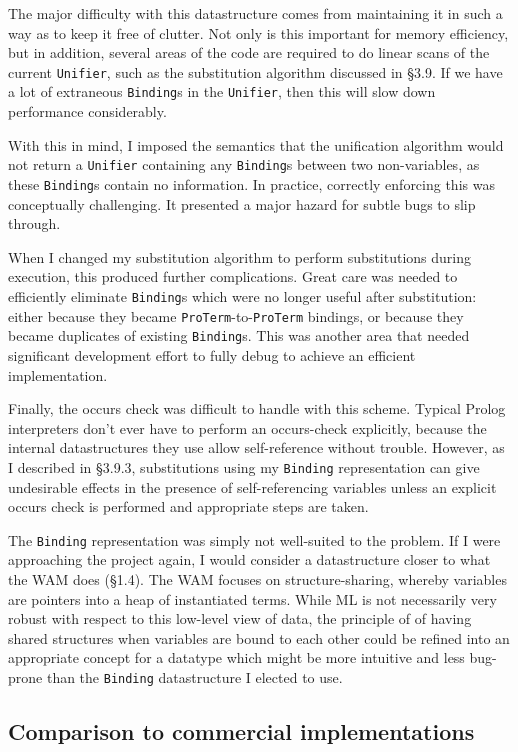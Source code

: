 \documentclass[12pt]{article}
\begin{document}
The major difficulty with this datastructure comes from maintaining it in such a way as to keep it free of clutter. 
Not only is this important for memory efficiency, but in addition, several areas of the code are required to do linear scans of the current \verb|Unifier|, such as the substitution algorithm discussed in \S3.9. 
If we have a lot of extraneous \verb|Binding|s in the \verb|Unifier|, then this will slow down performance considerably.

With this in mind, I imposed the semantics that the unification algorithm would not return a \verb|Unifier| containing any \verb|Binding|s between two non-variables, as these \verb|Binding|s contain no information. 
In practice, correctly enforcing this was conceptually challenging. 
It presented a major hazard for subtle bugs to slip through. 

When I changed my substitution algorithm to perform substitutions during execution, this produced further complications. 
Great care was needed to efficiently eliminate \verb|Binding|s which were no longer useful after substitution: either because they became \verb|ProTerm|-to-\verb|ProTerm| bindings, or because they became duplicates of existing \verb|Binding|s. 
This was another area that needed significant development effort to fully debug to achieve an efficient implementation.

Finally, the occurs check was difficult to handle with this scheme. 
Typical Prolog interpreters don't ever have to perform an occurs-check explicitly, because the internal datastructures they use allow self-reference without trouble.
However, as I described in \S3.9.3, substitutions using my \verb|Binding| representation can give undesirable effects in the presence of self-referencing variables unless an explicit occurs check is performed and appropriate steps are taken.

The \verb|Binding| representation was simply not well-suited to the problem. 
If I were approaching the project again, I would consider a datastructure closer to what the WAM does (\S1.4). 
The WAM focuses on structure-sharing, whereby variables are pointers into a heap of instantiated terms. 
While ML is not necessarily very robust with respect to this low-level view of data, the principle of of having shared structures when variables are bound to each other could be refined into an appropriate concept for a datatype which might be more intuitive and less bug-prone than the \verb|Binding| datastructure I elected to use.

\subsection{Comparison to commercial implementations}
\end{document}
